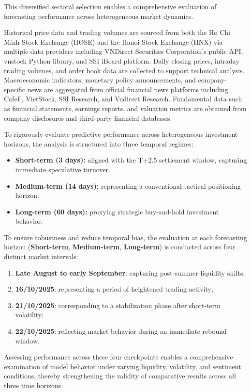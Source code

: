 \documentclass{ieeeaccess}
\begin{document}
This diversified sectoral selection enables a comprehensive evaluation of forecasting performance across heterogeneous market dynamics.

Historical price data and trading volumes are sourced from both the Ho Chi Minh Stock Exchange (HOSE) and the Hanoi Stock Exchange (HNX) via multiple data providers including VNDirect Securities Corporation's public API, vnstock Python library, and SSI iBoard platform. Daily closing prices, intraday trading volumes, and order book data are collected to support technical analysis. Macroeconomic indicators, monetary policy announcements, and company-specific news are aggregated from official financial news platforms including CafeF, VietStock, SSI Research, and Vndirect Research. Fundamental data such as financial statements, earnings reports, and valuation metrics are obtained from company disclosures and third-party financial databases.

To rigorously evaluate predictive performance across heterogeneous investment horizons, the 
analysis is structured into three temporal regimes:
\begin{itemize}
    \item \textbf{Short-term (3 days):} aligned with the T+2.5 settlement window, capturing immediate speculative turnover.
    \item \textbf{Medium-term (14 days):} representing a conventional tactical positioning horizon.
    \item \textbf{Long-term (60 days):} proxying strategic buy-and-hold investment behavior.
\end{itemize}

To ensure robustness and reduce temporal bias, the evaluation at each forecasting horizon (\textbf{Short-term}, \textbf{Medium-term}, \textbf{Long-term}) is conducted across four distinct market intervals:
\begin{enumerate}
    \item \textbf{Late August to early September}: capturing post-summer liquidity shifts;
    \item \textbf{16/10/2025}: representing a period of heightened trading activity;
    \item \textbf{21/10/2025}: corresponding to a stabilization phase after short-term volatility;
    \item \textbf{22/10/2025}: reflecting market behavior during an immediate rebound window.
\end{enumerate}
Assessing performance across these four checkpoints enables a comprehensive examination of model behavior under varying liquidity, volatility, and sentiment conditions, thereby strengthening the validity of comparative results across all three time horizons.
\end{document}
